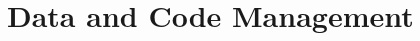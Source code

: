 \documentclass[oneside,11pt]{book}
\begin{document}

  

















\chapter{Data and Code Management}
\end{document}
